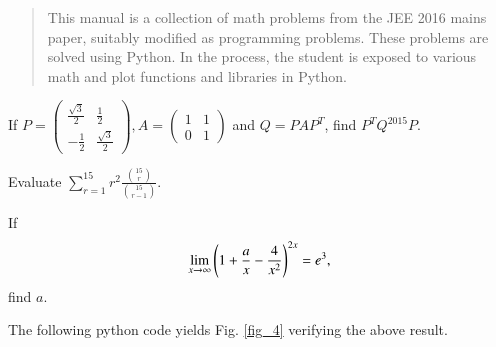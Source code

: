 \documentclass[journal,12pt,twocolumn]{IEEEtran}
\begin{document}
%
\IEEEpeerreviewmaketitle

\bigskip

\begin{abstract}
This manual is a collection of math problems from the JEE 2016 mains paper, suitably modified as programming problems. These problems are
solved using Python.  In the process, the student is exposed to various math and plot functions and libraries in Python. 
\end{abstract}
%
\begin{problem}
If $P = 
\begin{pmatrix}
\frac{\sqrt{3}}{2} & \frac{1}{2} \\
-\frac{1}{2} & \frac{\sqrt{3}}{2}
\end{pmatrix}, A = 
\begin{pmatrix}
1 & 1 \\
0 & 1
\end{pmatrix}
$ and $Q = P A P^{T}$, find $P^{T}Q^{2015} P$.
\end{problem}
\solution


\begin{problem}
Evaluate $\sum_{r=1}^{15}r^2 \frac{\binom{15}{r}}{\binom{15}{r-1}}$.
\end{problem}
\solution


\begin{problem}
If 
\begin{align}
\label{prob_four}
\lim_{x \rightarrow \infty} \left(1 + \frac{a}{x} - \frac{4}{x^2}\right)^{2x} = e^3,
\end{align}
 find $a$.
\end{problem}
\solution 

The following python code yields Fig. \ref{fig_4} verifying the above result.

\end{document}
